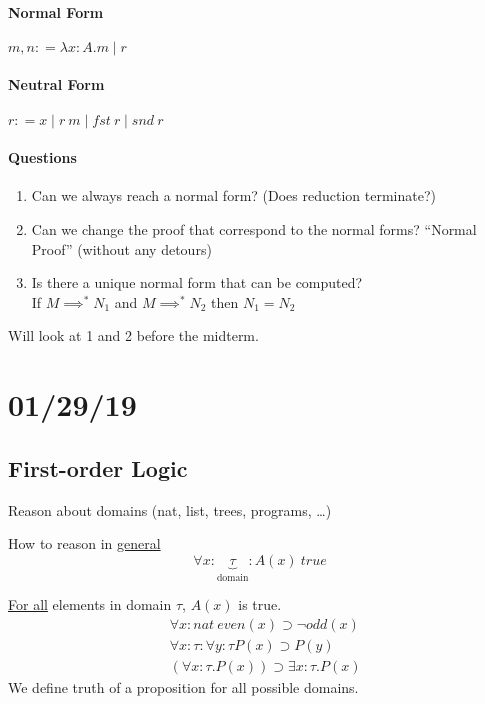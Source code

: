 \documentclass[12 pt]{article}
\begin{document}
        \paragraph{Normal Form} $m,n : = \lambda x:A.m \mid r$
        \paragraph{Neutral Form} $r : = x \mid r \ m \mid fst\ r \mid
        snd\ r$
        \paragraph{Questions}
        \begin{enumerate}
        \item Can we always reach a normal form? (Does reduction
          terminate?)
        \item Can we change the proof that correspond to the normal
          forms? ``Normal Proof'' (without any detours)
        \item Is there a unique normal form that can be computed?
          \\ If $M \implies^* N_1$ and $M \implies^* N_2$ then $N_1 = N_2$
        \end{enumerate}
        Will look at 1 and 2 before the midterm.
        \section{01/29/19}
        \subsection{First-order Logic}
        Reason about domains (nat, list, trees, programs, \ldots)

        How to reason in \underline{general}
        $$\forall x : \underbrace{\tau}_{\text{domain}} : A(x)\ true$$

        \underline{For all} elements in domain $\tau$, $A(x)$ is true.
        \begin{align*}
          & \forall x : nat\ even(x) \supset \neg odd(x)
          \\ & \forall x : \tau:\forall y:\tau P(x) \supset P(y)
          \\ & (\forall x: \tau . P(x)) \supset \exists x:\tau. P(x)
        \end{align*}
        We define truth of a proposition for all possible domains.
\end{document}
